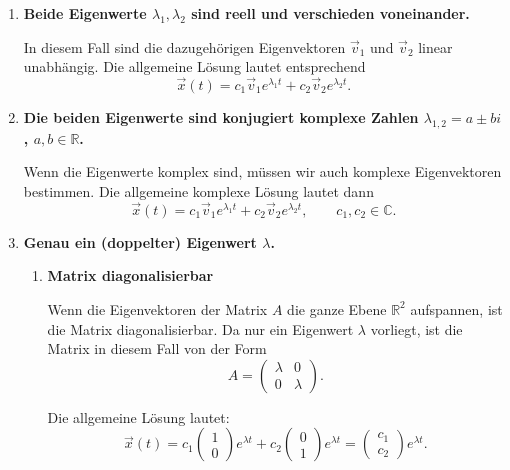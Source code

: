 \begin{enumerate}
    \item \textbf{Beide Eigenwerte \(\lambda_1,\lambda_2\) sind reell und verschieden voneinander.}

          In diesem Fall sind die dazugehörigen Eigenvektoren
          \(\vec{v}_1\) und \(\vec{v}_2\) linear unabhängig.
          Die allgemeine Lösung lautet entsprechend
          \[
              \vec{x}(t)
              = c_1 \vec{v}_1 e^{\lambda_1 t}
              + c_2 \vec{v}_2 e^{\lambda_2 t}.
          \]

    \item \textbf{Die beiden Eigenwerte sind konjugiert komplexe Zahlen
              \(\lambda_{1,2}=a\pm bi\), \(a,b\in\mathbb{R}\).}

          Wenn die Eigenwerte komplex sind, müssen wir auch komplexe
          Eigenvektoren bestimmen. Die allgemeine komplexe Lösung lautet dann
          \[
              \vec{x}(t)
              = c_1 \vec{v}_1 e^{\lambda_1 t}
              + c_2 \vec{v}_2 e^{\lambda_2 t},
              \qquad c_1,c_2\in\mathbb{C}.
          \]

    \item \textbf{Genau ein (doppelter) Eigenwert \(\lambda\).}

          \begin{enumerate}
              \item \textbf{Matrix diagonalisierbar}

                    Wenn die Eigenvektoren der Matrix \(A\) die ganze Ebene
                    \(\mathbb{R}^2\) aufspannen, ist die Matrix diagonalisierbar.
                    Da nur ein Eigenwert \(\lambda\) vorliegt, ist die Matrix
                    in diesem Fall von der Form
                    \[
                        A=
                        \begin{pmatrix}
                            \lambda & 0       \\
                            0       & \lambda
                        \end{pmatrix}.
                    \]

                    Die allgemeine Lösung lautet:
                    \[
                        \vec{x}(t)
                        = c_1
                        \begin{pmatrix}1\\0\end{pmatrix}e^{\lambda t}
                        + c_2
                        \begin{pmatrix}0\\1\end{pmatrix}e^{\lambda t}
                        =
                        \begin{pmatrix}c_1\\c_2\end{pmatrix}e^{\lambda t}.
                    \]


\end{enumerate}
\end{enumerate}
